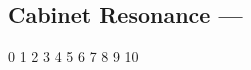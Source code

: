 \subsection[Cabinet Resonance]{Cabinet Resonance --- \UiKey{\I}\UiKey{\SET}}









































0
1
2
3
4
5
6
7
8
9
10
